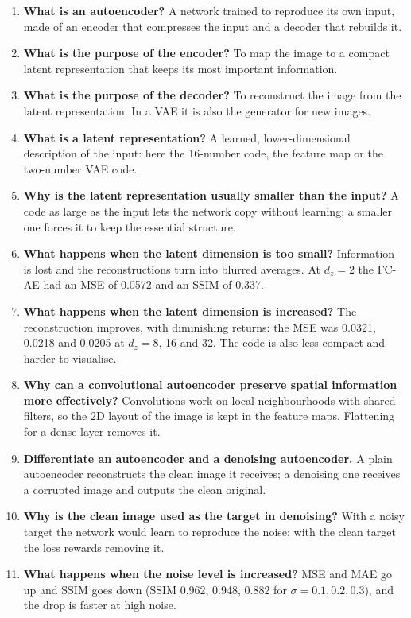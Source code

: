 \documentclass[10pt]{article}
\begin{document}
\begin{enumerate}
\item \textbf{What is an autoencoder?} A network trained to reproduce its own input, made of an encoder that
compresses the input and a decoder that rebuilds it.
\item \textbf{What is the purpose of the encoder?} To map the image to a compact latent representation that keeps its most important information.
\item \textbf{What is the purpose of the decoder?} To reconstruct the image from the latent representation. In a VAE it is also the generator for new images.
\item \textbf{What is a latent representation?} A learned, lower-dimensional description of the input: here the 16-number code, the feature map or the two-number VAE code.
\item \textbf{Why is the latent representation usually smaller than the input?} A code as large as the input lets the network copy without learning; a smaller one forces it to keep the essential structure.
\item \textbf{What happens when the latent dimension is too small?} Information is lost
and the reconstructions turn into blurred averages. At $d_z=2$ the FC-AE had an MSE of
0.0572 and an SSIM of 0.337.
\item \textbf{What happens when the latent dimension is increased?} The reconstruction
improves, with diminishing returns: the MSE was 0.0321, 0.0218 and 0.0205 at
$d_z=8$, 16 and 32. The code is also less compact and harder to visualise.
\item \textbf{Why can a convolutional autoencoder preserve spatial information more
effectively?} Convolutions work on local neighbourhoods with shared filters, so the 2D
layout of the image is kept in the feature maps. Flattening for a dense layer removes it.
\item \textbf{Differentiate an autoencoder and a denoising autoencoder.} A plain autoencoder reconstructs the clean image it receives; a denoising one receives a corrupted image and outputs the clean original.
\item \textbf{Why is the clean image used as the target in denoising?} With a noisy target the network would learn to reproduce the noise; with the clean target the loss rewards removing it.
\item \textbf{What happens when the noise level is increased?} MSE and MAE go up and SSIM
goes down (SSIM 0.962, 0.948, 0.882 for $\sigma=0.1,0.2,0.3$), and the drop is faster at high noise.

\end{enumerate}
\end{document}
